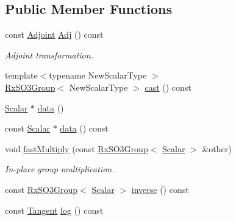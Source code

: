 \subsection*{Public Member Functions}
\begin{DoxyCompactItemize}
\item 
const \hyperlink{class_sophus_1_1_rx_s_o3_group_base_a3f7cc9982043bf0082b7946f566a8179}{Adjoint} \hyperlink{class_sophus_1_1_rx_s_o3_group_base_a905a15824f72eeae9fcba7d2eec00c4c}{Adj} () const 
\begin{DoxyCompactList}\small\item\em Adjoint transformation. \end{DoxyCompactList}\item 
{\footnotesize template$<$typename New\+Scalar\+Type $>$ }\\\hyperlink{class_sophus_1_1_rx_s_o3_group}{Rx\+S\+O3\+Group}$<$ New\+Scalar\+Type $>$ \hyperlink{class_sophus_1_1_rx_s_o3_group_base_abef15272073c5590bd914655b176874d}{cast} () const 
\item 
\hyperlink{class_sophus_1_1_rx_s_o3_group_base_af4006e7d95216a7e50823a1cd9c9e265}{Scalar} $\ast$ \hyperlink{class_sophus_1_1_rx_s_o3_group_base_a518457683a0b4b89ea6435579b3455f9}{data} ()
\item 
const \hyperlink{class_sophus_1_1_rx_s_o3_group_base_af4006e7d95216a7e50823a1cd9c9e265}{Scalar} $\ast$ \hyperlink{class_sophus_1_1_rx_s_o3_group_base_af9375223fdd4e0ac9b3866730800c0ba}{data} () const 
\item 
void \hyperlink{class_sophus_1_1_rx_s_o3_group_base_adc77a40831c4a064ef833e7697152e98}{fast\+Multiply} (const \hyperlink{class_sophus_1_1_rx_s_o3_group}{Rx\+S\+O3\+Group}$<$ \hyperlink{class_sophus_1_1_rx_s_o3_group_base_af4006e7d95216a7e50823a1cd9c9e265}{Scalar} $>$ \&other)
\begin{DoxyCompactList}\small\item\em In-\/place group multiplication. \end{DoxyCompactList}\item 
const \hyperlink{class_sophus_1_1_rx_s_o3_group}{Rx\+S\+O3\+Group}$<$ \hyperlink{class_sophus_1_1_rx_s_o3_group_base_af4006e7d95216a7e50823a1cd9c9e265}{Scalar} $>$ \hyperlink{class_sophus_1_1_rx_s_o3_group_base_a3b47ec202990b4bd08859feafdca1cef}{inverse} () const 
\item 
const \hyperlink{class_sophus_1_1_rx_s_o3_group_base_aa1c4034b0a69496b28f1e81fdc7510c5}{Tangent} \hyperlink{class_sophus_1_1_rx_s_o3_group_base_aa201b101217eb02366ae02d423a1ef0d}{log} () const 

\end{DoxyCompactItemize}
